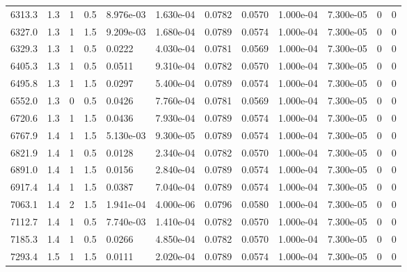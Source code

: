 \documentclass[preview]{standalone}
\begin{document}
{{{\begin{tabular}{L{1.2cm}C{1.2cm} C{0.3cm}C{0.5cm} C{1.4cm}C{1.4cm} C{1.4cm}C{1.4cm} C{1.6cm}C{1.6cm} C{1.6cm}C{1.6cm}}
  6313.3  &   1.3  & 1     & 0.5 &  8.976e-03  & 1.630e-04  &  0.0782&   0.0570& 1.000e-04 & 7.300e-05   &  0 & 0  \\ 
  6327.0  &   1.3  & 1     & 1.5 &  9.209e-03  & 1.680e-04  &  0.0789&   0.0574& 1.000e-04 & 7.300e-05   &  0 & 0  \\ 
  6329.3  &   1.3  & 1     & 0.5 &  0.0222  & 4.030e-04  &  0.0781&   0.0569& 1.000e-04 & 7.300e-05   &  0 & 0  \\ 
  6405.3  &   1.3  & 1     & 0.5 &  0.0511  & 9.310e-04  &  0.0782&   0.0570& 1.000e-04 & 7.300e-05   &  0 & 0  \\ 
  6495.8  &   1.3  & 1     & 1.5 &  0.0297  & 5.400e-04  &  0.0789&   0.0574& 1.000e-04 & 7.300e-05   &  0 & 0  \\ 
  6552.0  &   1.3  & 0     & 0.5 &  0.0426  & 7.760e-04  &  0.0781&   0.0569& 1.000e-04 & 7.300e-05   &  0 & 0  \\ 
  6720.6  &   1.3  & 1     & 1.5 &  0.0436  & 7.930e-04  &  0.0789&   0.0574& 1.000e-04 & 7.300e-05   &  0 & 0  \\ 
  6767.9  &   1.4  & 1     & 1.5 &  5.130e-03  & 9.300e-05  &  0.0789&   0.0574& 1.000e-04 & 7.300e-05   &  0 & 0  \\ 
  6821.9  &   1.4  & 1     & 0.5 &  0.0128  & 2.340e-04  &  0.0782&   0.0570& 1.000e-04 & 7.300e-05   &  0 & 0  \\ 
  6891.0  &   1.4  & 1     & 1.5 &  0.0156  & 2.840e-04  &  0.0789&   0.0574& 1.000e-04 & 7.300e-05   &  0 & 0  \\ 
  6917.4  &   1.4  & 1     & 1.5 &  0.0387  & 7.040e-04  &  0.0789&   0.0574& 1.000e-04 & 7.300e-05   &  0 & 0  \\ 
  7063.1  &   1.4  & 2     & 1.5 &  1.941e-04  & 4.000e-06  &  0.0796&   0.0580& 1.000e-04 & 7.300e-05   &  0 & 0  \\ 
  7112.7  &   1.4  & 1     & 0.5 &  7.740e-03  & 1.410e-04  &  0.0782&   0.0570& 1.000e-04 & 7.300e-05   &  0 & 0  \\ 
  7185.3  &   1.4  & 1     & 0.5 &  0.0266  & 4.850e-04  &  0.0782&   0.0570& 1.000e-04 & 7.300e-05   &  0 & 0  \\ 
  7293.4  &   1.5  & 1     & 1.5 &  0.0111  & 2.020e-04  &  0.0789&   0.0574& 1.000e-04 & 7.300e-05   &  0 & 0  \\ 
\hline 
\end{tabular} 

}}}
\end{document}
